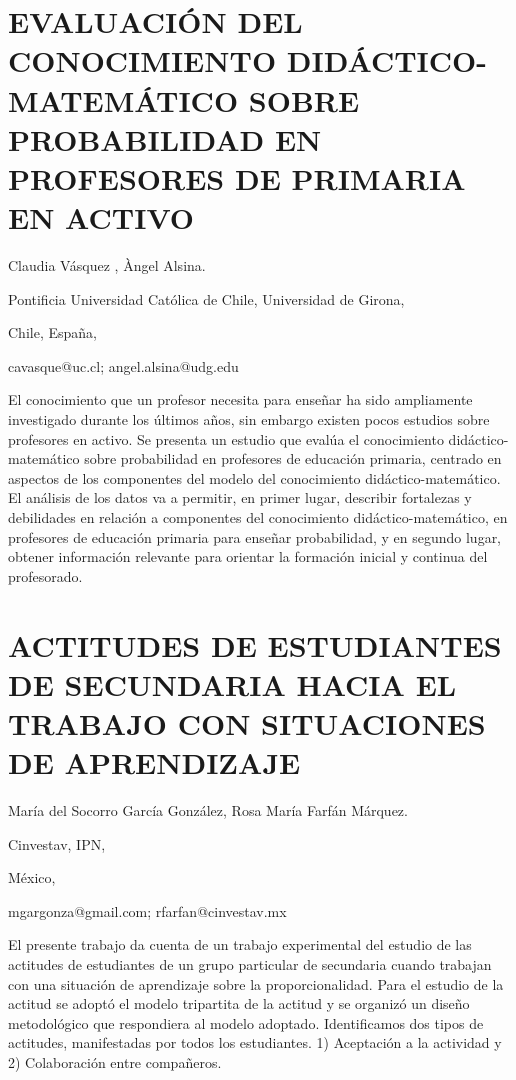 \section{EVALUACIÓN DEL CONOCIMIENTO DIDÁCTICO-MATEMÁTICO SOBRE PROBABILIDAD
EN PROFESORES DE PRIMARIA EN ACTIVO}

\begin{datos}

Claudia Vásquez , Àngel Alsina.

Pontificia Universidad Católica de Chile, Universidad de Girona,

Chile, España,

cavasque@uc.cl; angel.alsina@udg.edu

\end{datos}

El conocimiento que un profesor necesita para enseñar ha sido ampliamente
investigado durante los últimos años, sin embargo existen pocos estudios
sobre profesores en activo. Se presenta un estudio que evalúa el conocimiento
didáctico-matemático sobre probabilidad en profesores de educación
primaria, centrado en aspectos de los componentes del modelo del conocimiento
didáctico-matemático. El análisis de los datos va a permitir, en primer
lugar, describir fortalezas y debilidades en relación a componentes
del conocimiento didáctico-matemático, en profesores de educación
primaria para enseñar probabilidad, y en segundo lugar, obtener información
relevante para orientar la formación inicial y continua del profesorado.


\section{ACTITUDES DE ESTUDIANTES DE SECUNDARIA HACIA EL TRABAJO CON SITUACIONES
DE APRENDIZAJE}

\begin{datos}

María del Socorro García González, Rosa María Farfán Márquez.

Cinvestav, IPN,

México,

mgargonza@gmail.com; rfarfan@cinvestav.mx 

\end{datos}

El presente trabajo da cuenta de un trabajo experimental del estudio
de las actitudes de estudiantes de un grupo particular de secundaria
cuando trabajan con una situación de aprendizaje sobre la proporcionalidad.
Para el estudio de la actitud se adoptó el modelo tripartita de la
actitud y se organizó un diseño metodológico que respondiera al modelo
adoptado. Identificamos dos tipos de actitudes, manifestadas por todos
los estudiantes. 1) Aceptación a la actividad y 2) Colaboración entre
compañeros.


